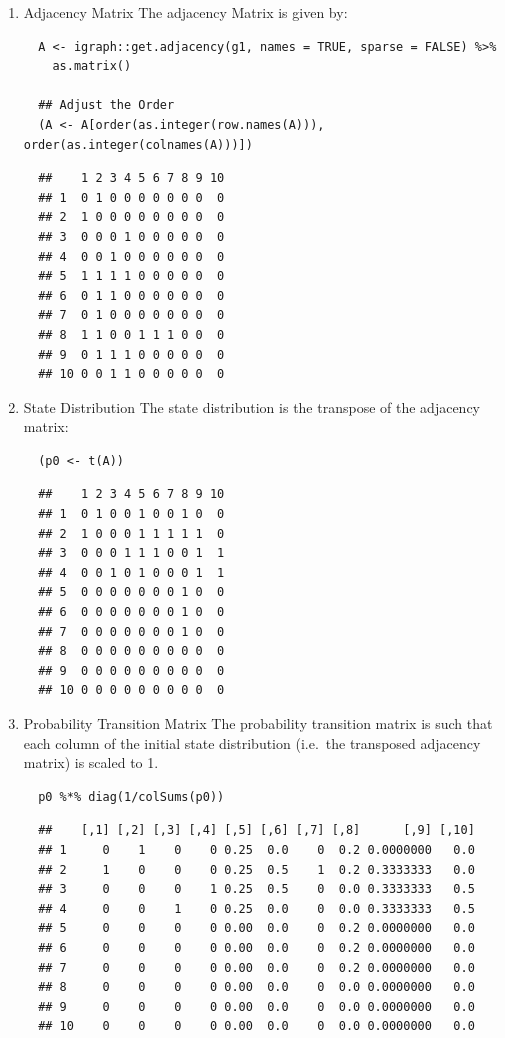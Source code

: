 \documentclass[11pt]{article}
\begin{document}
\begin{enumerate}
\item Adjacency Matrix
\label{adjacency-matrix}
The adjacency Matrix is given by:

\begin{verbatim}
  A <- igraph::get.adjacency(g1, names = TRUE, sparse = FALSE) %>%
    as.matrix()

  ## Adjust the Order
  (A <- A[order(as.integer(row.names(A))), order(as.integer(colnames(A)))])
\end{verbatim}

\begin{verbatim}
  ##    1 2 3 4 5 6 7 8 9 10
  ## 1  0 1 0 0 0 0 0 0 0  0
  ## 2  1 0 0 0 0 0 0 0 0  0
  ## 3  0 0 0 1 0 0 0 0 0  0
  ## 4  0 0 1 0 0 0 0 0 0  0
  ## 5  1 1 1 1 0 0 0 0 0  0
  ## 6  0 1 1 0 0 0 0 0 0  0
  ## 7  0 1 0 0 0 0 0 0 0  0
  ## 8  1 1 0 0 1 1 1 0 0  0
  ## 9  0 1 1 1 0 0 0 0 0  0
  ## 10 0 0 1 1 0 0 0 0 0  0
\end{verbatim}

\item State Distribution
\label{state-distribution}
The state distribution is the transpose of the adjacency matrix:

\begin{verbatim}
  (p0 <- t(A))
\end{verbatim}

\begin{verbatim}
  ##    1 2 3 4 5 6 7 8 9 10
  ## 1  0 1 0 0 1 0 0 1 0  0
  ## 2  1 0 0 0 1 1 1 1 1  0
  ## 3  0 0 0 1 1 1 0 0 1  1
  ## 4  0 0 1 0 1 0 0 0 1  1
  ## 5  0 0 0 0 0 0 0 1 0  0
  ## 6  0 0 0 0 0 0 0 1 0  0
  ## 7  0 0 0 0 0 0 0 1 0  0
  ## 8  0 0 0 0 0 0 0 0 0  0
  ## 9  0 0 0 0 0 0 0 0 0  0
  ## 10 0 0 0 0 0 0 0 0 0  0
\end{verbatim}

\item Probability Transition Matrix
\label{probability-transition-matrix}
The probability transition matrix is such that each column of the
initial state distribution (i.e. the transposed adjacency matrix) is
scaled to 1.

\begin{verbatim}
  p0 %*% diag(1/colSums(p0))
\end{verbatim}

\begin{verbatim}
  ##    [,1] [,2] [,3] [,4] [,5] [,6] [,7] [,8]      [,9] [,10]
  ## 1     0    1    0    0 0.25  0.0    0  0.2 0.0000000   0.0
  ## 2     1    0    0    0 0.25  0.5    1  0.2 0.3333333   0.0
  ## 3     0    0    0    1 0.25  0.5    0  0.0 0.3333333   0.5
  ## 4     0    0    1    0 0.25  0.0    0  0.0 0.3333333   0.5
  ## 5     0    0    0    0 0.00  0.0    0  0.2 0.0000000   0.0
  ## 6     0    0    0    0 0.00  0.0    0  0.2 0.0000000   0.0
  ## 7     0    0    0    0 0.00  0.0    0  0.2 0.0000000   0.0
  ## 8     0    0    0    0 0.00  0.0    0  0.0 0.0000000   0.0
  ## 9     0    0    0    0 0.00  0.0    0  0.0 0.0000000   0.0
  ## 10    0    0    0    0 0.00  0.0    0  0.0 0.0000000   0.0
\end{verbatim}


\end{enumerate}
\end{document}
